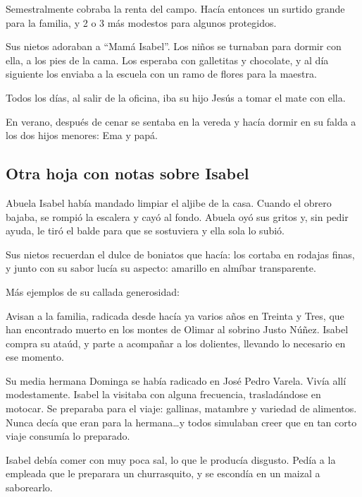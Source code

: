 \documentclass[a4paper]{article}
\begin{document}
Semestralmente cobraba la renta del campo. Hacía entonces un surtido grande para la familia, y 2 o 3 más modestos para algunos protegidos.

Sus nietos adoraban a ``Mamá Isabel''. Los niños se turnaban para dormir con ella, a los pies de la cama. Los esperaba con galletitas y chocolate, y al día siguiente los enviaba a la escuela con un ramo de flores para la maestra.

Todos los días, al salir de la oficina, iba su hijo Jesús a tomar el mate con ella.

En verano, después de cenar se sentaba en la vereda y hacía dormir en su falda a los dos hijos menores: Ema y papá.

\subsection{Otra hoja con notas sobre Isabel}

Abuela Isabel había mandado limpiar el aljibe de la casa. Cuando el obrero bajaba, se rompió la escalera y cayó al fondo. Abuela oyó sus gritos y, sin pedir ayuda, le tiró el balde para que se sostuviera y ella sola lo subió.

\bigbreak{}

Sus nietos recuerdan el dulce de boniatos que hacía: los cortaba en rodajas finas, y junto con su sabor lucía su aspecto: amarillo en almíbar transparente.

\bigbreak{}

Más ejemplos de su callada generosidad:

Avisan a la familia, radicada desde hacía ya varios años en Treinta y Tres, que han encontrado muerto en los montes de Olimar al sobrino Justo Núñez. Isabel compra su ataúd, y parte a acompañar a los dolientes, llevando lo necesario en ese momento.

\bigbreak{}

Su media hermana Dominga se había radicado en José Pedro Varela. Vivía allí modestamente. Isabel la visitaba con alguna frecuencia, trasladándose en motocar. Se preparaba para el viaje: gallinas, matambre y variedad de alimentos. Nunca decía que eran para la hermana\ldots y todos simulaban creer que en tan corto viaje consumía lo preparado.

\bigbreak{}

Isabel debía comer con muy poca sal, lo que le producía disgusto. Pedía a la empleada que le preparara un churrasquito, y se escondía en un maizal a saborearlo.
\end{document}
